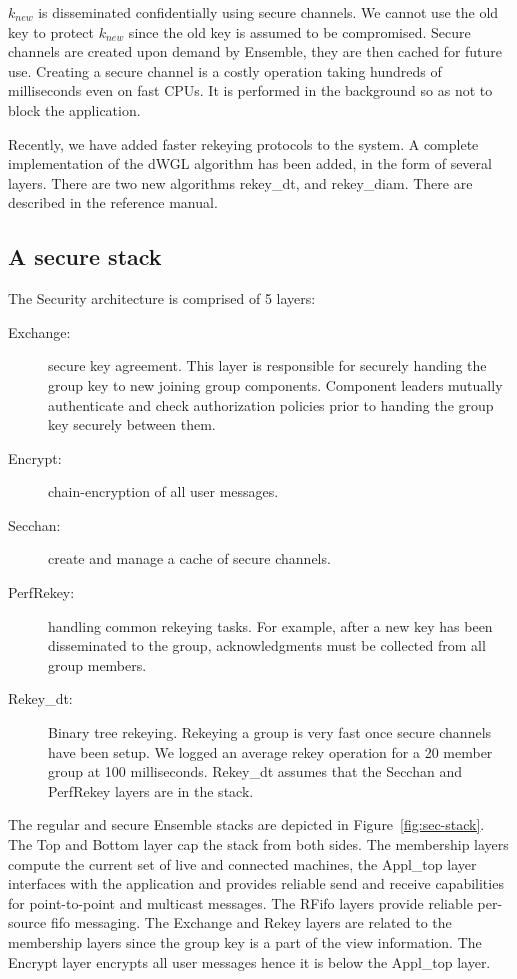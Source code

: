 $k_{new}$ is disseminated confidentially using secure channels. We
cannot use the old key to protect $k_{new}$ since the old key is
assumed to be compromised. Secure channels are created upon
demand by Ensemble, they are then cached for future use. Creating a secure
channel is a costly operation taking hundreds of milliseconds even on
fast CPUs. It is performed in the background so as not to block the
application.

Recently, we have added faster rekeying protocols to the system. A
complete implementation of the dWGL algorithm has been added, in the
form of several layers. There are two new algorithms rekey\_dt, and
rekey\_diam. There are described in the reference manual. 

\subsection{A secure stack}
The Security architecture is comprised of 5 layers:
\begin{description}
\item
[Exchange:] secure key agreement. This layer is responsible for
securely handing the group key to new joining group components. Component
leaders mutually authenticate and check authorization policies prior
to handing the group key securely between them.
\item
[Encrypt:] chain-encryption of all user messages.
\item 
[Secchan:] create and manage a cache of secure channels. 
\item 
[PerfRekey:] handling common rekeying tasks. For example, after a new
key has been disseminated to the group, acknowledgments must be
collected from all group members.
\item
[Rekey\_dt:] Binary tree rekeying. Rekeying a group is very fast once secure
channels have been setup. We logged an average rekey operation for a 20 member
group at 100 milliseconds. Rekey\_dt assumes that the Secchan and
PerfRekey layers are in the stack. 
\end{description}

The regular and secure Ensemble stacks are depicted in
Figure~\ref{fig:sec-stack}. The Top and Bottom layer cap the stack
from both sides. The membership layers compute the current set of live
and connected machines, the Appl\_top layer interfaces with the
application and provides reliable send and receive capabilities for
point-to-point and multicast messages. The RFifo layers provide
reliable per-source fifo messaging. The Exchange and Rekey layers are
related to the membership layers since the group key is a part of the
view information. The Encrypt layer encrypts all user messages hence
it is below the Appl\_top layer.

